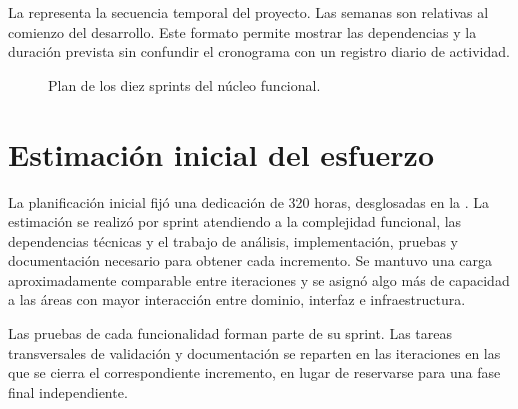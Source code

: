 La  representa la secuencia temporal del proyecto.
Las semanas son relativas al comienzo del desarrollo. Este formato permite
mostrar las dependencias y la duración prevista sin confundir el cronograma con
un registro diario de actividad.

\begin{figure}[H]
  \centering
  \resizebox{\textwidth}{!}{
    
  }
  \caption{Plan de los diez sprints del núcleo funcional.}
  \label{fig:core-sprint-plan}
\end{figure}

\section{Estimación inicial del esfuerzo}

La planificación inicial fijó una dedicación de 320 horas, desglosadas en la
. La estimación se
realizó por sprint atendiendo a la complejidad funcional, las dependencias
técnicas y el
trabajo de análisis, implementación, pruebas y documentación necesario para
obtener cada incremento. Se mantuvo una carga aproximadamente comparable entre
iteraciones y se asignó algo más de capacidad a las áreas con mayor interacción
entre dominio, interfaz e infraestructura.

Las pruebas de cada funcionalidad forman parte de su sprint. Las tareas
transversales de validación y documentación se reparten en las iteraciones en
las que se cierra el correspondiente incremento, en lugar de reservarse para
una fase final independiente.

